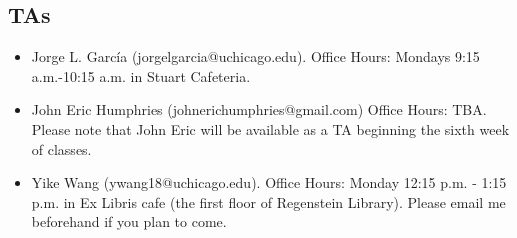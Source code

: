 \documentclass[12pt]{article}
\begin{document}
\subsection{TAs}
\begin{itemize}
\item Jorge L. Garc\'{i}a (jorgelgarcia@uchicago.edu). Office Hours: Mondays 9:15 a.m.-10:15 a.m. in Stuart Cafeteria.
\item John Eric Humphries (johnerichumphries@gmail.com) Office Hours: TBA. Please note that John Eric will be available as a TA beginning the sixth week of classes.
\item Yike Wang (ywang18@uchicago.edu). Office Hours: Monday 12:15 p.m. - 1:15 p.m. in Ex Libris cafe (the first floor of Regenstein Library). Please email me beforehand if you plan to come.

\end{itemize}
\end{document}
